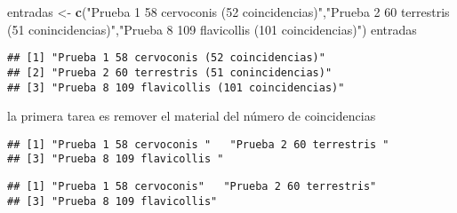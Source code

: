 \documentclass[]{article}
\newenvironment{Shaded}{\begin{snugshade}}{\end{snugshade}}
\newcommand{\KeywordTok}[1]{\textcolor[rgb]{0.13,0.29,0.53}{\textbf{#1}}}
\newcommand{\CharTok}[1]{\textcolor[rgb]{0.31,0.60,0.02}{#1}}
\newcommand{\StringTok}[1]{\textcolor[rgb]{0.31,0.60,0.02}{#1}}
\newcommand{\NormalTok}[1]{#1}
\begin{document}
\begin{Shaded}
\begin{Highlighting}[]
\NormalTok{entradas <-}\StringTok{ }\KeywordTok{c}\NormalTok{(}\StringTok{"Prueba 1 58 cervoconis (52 coincidencias)"}\NormalTok{,}\StringTok{"Prueba 2 60 terrestris (51 conincidencias)"}\NormalTok{,}\StringTok{"Prueba 8 109 flavicollis (101 coincidencias)"}\NormalTok{)}
\NormalTok{entradas}
\end{Highlighting}
\end{Shaded}

\begin{verbatim}
## [1] "Prueba 1 58 cervoconis (52 coincidencias)"   
## [2] "Prueba 2 60 terrestris (51 conincidencias)"  
## [3] "Prueba 8 109 flavicollis (101 coincidencias)"
\end{verbatim}

la primera tarea es remover el material del número de coincidencias

\begin{Shaded}
\end{Shaded}

\begin{verbatim}
## [1] "Prueba 1 58 cervoconis "   "Prueba 2 60 terrestris "  
## [3] "Prueba 8 109 flavicollis "
\end{verbatim}

\begin{Shaded}
\end{Shaded}

\begin{verbatim}
## [1] "Prueba 1 58 cervoconis"   "Prueba 2 60 terrestris"  
## [3] "Prueba 8 109 flavicollis"
\end{verbatim}

\begin{Shaded}
\end{Shaded}
\end{document}
